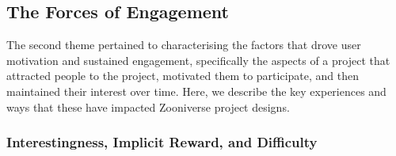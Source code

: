 \documentclass{sigchi}
\begin{document}



\subsection{The Forces of Engagement}

The second theme pertained to characterising the factors that drove user motivation and sustained engagement, specifically the aspects of a project  that attracted people to the project, motivated them to participate, and then maintained their interest over time. Here, we describe the key experiences and ways that these have impacted Zooniverse project designs.

\subsubsection{Interestingness, Implicit Reward, and Difficulty} 
\end{document}
